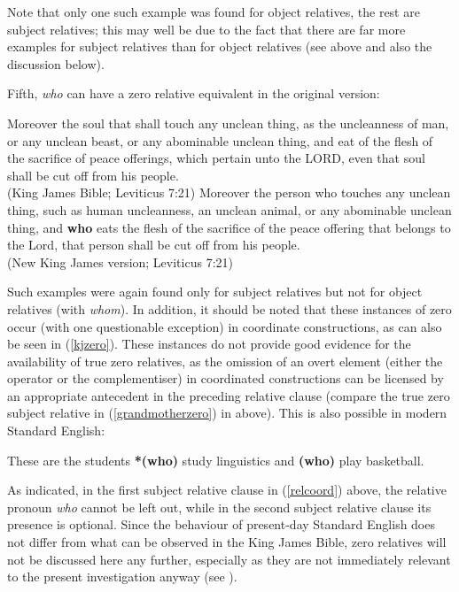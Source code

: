 Note that only one such example was found for object relatives, the rest are subject relatives; this may well be due to the fact that there are far more examples for subject relatives than for object relatives (see above and also the discussion below).

Fifth, \textit{who} can have a zero relative equivalent in the original version:

\ea \label{kjzero}
\ea Moreover the soul that shall touch any unclean thing, as the uncleanness of man, or any unclean beast, or any abominable unclean thing, and eat of the flesh of the sacrifice of peace offerings, which pertain unto the LORD, even that soul shall be cut off from his people. \\
(King James Bible; Leviticus 7:21)
\ex Moreover the person who touches any unclean thing, such as human uncleanness, an unclean animal, or any abominable unclean thing, and \textbf{who} eats the flesh of the sacrifice of the peace offering that belongs to the Lord, that person shall be cut off from his people.\\
(New King James version; Leviticus 7:21)
\z
\z

Such examples were again found only for subject relatives but not for object relatives (with \textit{whom}). In addition, it should be noted that these instances of zero occur (with one questionable exception) in coordinate constructions, as can also be seen in (\ref{kjzero}). These instances do not provide good evidence for the availability of true zero relatives, as the omission of an overt element (either the operator or the complementiser) in coordinated constructions can be licensed by an appropriate antecedent in the preceding relative clause (compare the true zero subject relative in (\ref{grandmotherzero}) in  above). This is also possible in modern Standard English:

\ea These are the students \textbf{*(who)} study linguistics and \textbf{(who)} play basketball. \label{relcoord}
\z

As indicated, in the first subject relative clause in (\ref{relcoord}) above, the relative pronoun \textit{who} cannot be left out, while in the second subject relative clause its presence is optional. Since the behaviour of present-day Standard English does not differ from what can be observed in the King James Bible, zero relatives will not be discussed here any further, especially as they are not immediately relevant to the present investigation anyway (see ).


